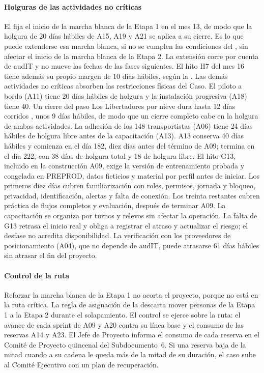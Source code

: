 \paragraph{Holguras de las actividades no críticas}
El  fija el inicio de la marcha blanca de la Etapa 1 en el mes 13, de modo que la holgura
de 20 días hábiles de A15, A19 y A21 se aplica a su cierre. Es lo que puede extenderse esa marcha
blanca, si no se cumplen las condiciones del , sin afectar el inicio de la marcha blanca
de la Etapa 2. La extensión corre por cuenta de audIT y no mueve las fechas de las fases siguientes. El
hito H7 del mes 16 tiene además su propio margen de 10 días hábiles, según la . Las
demás actividades no críticas absorben las restricciones físicas del Caso. El piloto a bordo (A11)
tiene 20 días hábiles de holgura y la instalación progresiva (A18) tiene 40. Un cierre del paso Los
Libertadores por nieve dura hasta 12 días corridos , unos 9 días hábiles, de
modo que un cierre completo cabe en la holgura de ambas actividades. La adhesión de los 148
transportistas (A06) tiene 24 días hábiles de holgura libre antes de la capacitación (A13). A13
conserva 40 días hábiles y comienza en el día 182, diez días antes del término de A09;
termina en el día 222, con 38 días de holgura total y 18 de holgura libre. El hito G13,
incluido en la construcción A09, exige la versión de entrenamiento probada y congelada
en PREPROD, datos ficticios y material por perfil antes de iniciar. Los primeros diez días
cubren familiarización con roles, permisos, jornada y bloqueo, privacidad, identificación,
alertas y falta de conexión. Los treinta restantes cubren práctica de flujos completos
y evaluación, después de terminar A09. La capacitación se organiza por turnos y relevos
sin afectar la operación. La falta de G13 retrasa el inicio real y obliga a registrar
el atraso y actualizar el riesgo; el desfase no acredita disponibilidad. La
verificación con los proveedores de posicionamiento (A04), que no depende de audIT, puede atrasarse 61
días hábiles sin atrasar el fin del proyecto.

\paragraph{Control de la ruta}
Reforzar la marcha blanca de la Etapa 1 no acorta el proyecto, porque no está en la ruta crítica. La
regla de asignación de la  descarta mover personas de la Etapa 1 a la
Etapa 2 durante el solapamiento. El control se ejerce sobre la ruta: el avance de cada sprint de A09 y
A20 contra su línea base y el consumo de las reservas A14 y A23. El Jefe de Proyecto informa el consumo
de cada reserva en el Comité de Proyecto quincenal del Subdocumento~6. Si una reserva baja de la mitad
cuando a su cadena le queda más de la mitad de su duración, el caso sube al Comité Ejecutivo con un
plan de recuperación.


